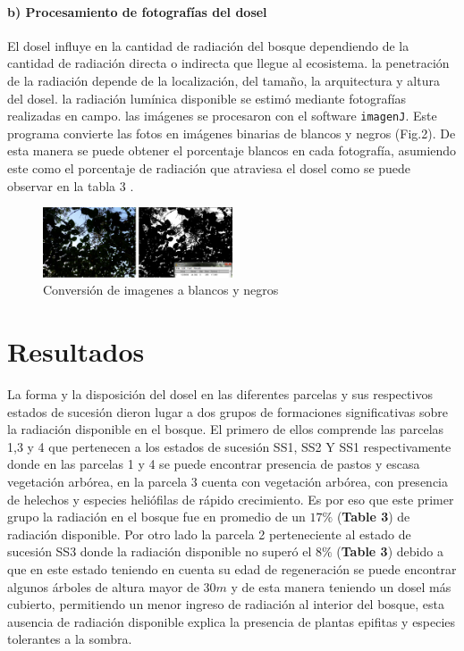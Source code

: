 \documentclass[letterpaper,9pt,twocolumn,twoside,]{pinp}
\begin{document}
\hypertarget{b-procesamiento-de-fotografuxedas-del-dosel}{%
\paragraph{b) Procesamiento de fotografías del
dosel}\label{b-procesamiento-de-fotografuxedas-del-dosel}}

El dosel influye en la cantidad de radiación del bosque dependiendo de
la cantidad de radiación directa o indirecta que llegue al ecosistema.
la penetración de la radiación depende de la localización, del tamaño,
la arquitectura y altura del dosel. la radiación lumínica disponible se
estimó mediante fotografías realizadas en campo. las imágenes se
procesaron con el software \texttt{imagenJ}. Este programa convierte las
fotos en imágenes binarias de blancos y negros (Fig.2). De esta manera
se puede obtener el porcentaje blancos en cada fotografía, asumiendo
este como el porcentaje de radiación que atraviesa el dosel como se
puede observar en la tabla 3 .

\begin{figure}[h]
  \centering
  \includegraphics[width= 0.5\textwidth]{ima2.png}
  \caption{Conversión de imagenes a blancos y negros}
\end{figure}

\hypertarget{resultados}{%
\section{Resultados}\label{resultados}}

La forma y la disposición del dosel en las diferentes parcelas y sus
respectivos estados de sucesión dieron lugar a dos grupos de formaciones
significativas sobre la radiación disponible en el bosque. El primero de
ellos comprende las parcelas 1,3 y 4 que pertenecen a los estados de
sucesión SS1, SS2 Y SS1 respectivamente donde en las parcelas 1 y 4 se
puede encontrar presencia de pastos y escasa vegetación arbórea, en la
parcela 3 cuenta con vegetación arbórea, con presencia de helechos y
especies heliófilas de rápido crecimiento. Es por eso que este primer
grupo la radiación en el bosque fue en promedio de un \(17 \%\)
(\textbf{Table 3}) de radiación disponible. Por otro lado la parcela 2
perteneciente al estado de sucesión SS3 donde la radiación disponible no
superó el \(8 \%\) (\textbf{Table 3}) debido a que en este estado
teniendo en cuenta su edad de regeneración se puede encontrar algunos
árboles de altura mayor de \(30 m\) y de esta manera teniendo un dosel
más cubierto, permitiendo un menor ingreso de radiación al interior del
bosque, esta ausencia de radiación disponible explica la presencia de
plantas epifitas y especies tolerantes a la sombra.
\end{document}
